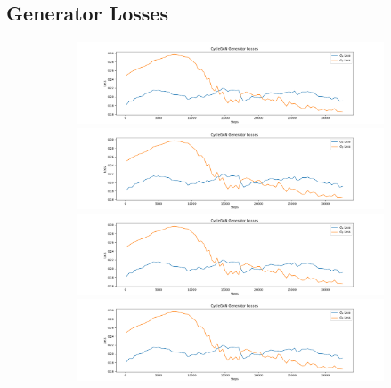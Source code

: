 \documentclass[12pt, fleqn, titlepage]{article}
\begin{document}
\subsection{Generator Losses}\label{gen_loss}
\begin{figure}[H]
	\centering
	\begin{subfigure}[b]{0.8\textwidth}
		\centering
		\includegraphics[width=\linewidth]{imgs/placeholder_generator_losses}
		\hfill
		\includegraphics[width=\linewidth]{imgs/placeholder_generator_losses}
		\hfill
		\includegraphics[width=\linewidth]{imgs/placeholder_generator_losses}
		\hfill
		\includegraphics[width=\linewidth]{imgs/placeholder_generator_losses}
	\end{subfigure}
\end{figure}
\end{document}
